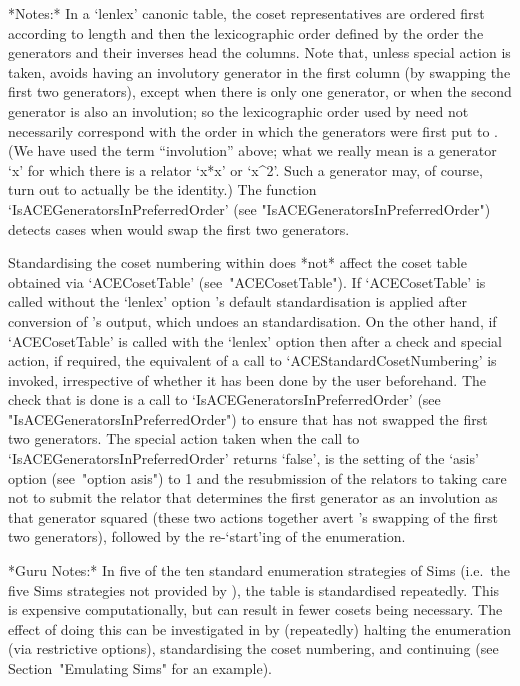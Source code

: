 *Notes:*
In a `lenlex' canonic table, the  coset  representatives  are  ordered
first according to length and then the lexicographic order defined  by
the order the generators and their inverses  head  the  columns.  Note
that,  unless  special  action  is  taken,  {\ACE}  avoids  having  an
involutory generator in the first column (by swapping  the  first  two
generators), except when there is only  one  generator,  or  when  the
second generator is also an involution;  so  the  lexicographic  order
used by {\ACE} need not necessarily correspond with the order in which
the generators were first put  to  {\ACE}.  (We  have  used  the  term
``involution'' above; what we really mean is  a  generator  `x'  for
which there is a relator `x*x' or `x^2'.  Such  a  generator  may,  of
course,  turn  out  to  actually  be  the  identity.)   The   function
`IsACEGeneratorsInPreferredOrder'                                 (see
"IsACEGeneratorsInPreferredOrder") detects  cases  when  {\ACE}  would
swap the first two generators.

Standardising the coset numbering within {\ACE} does *not* affect  the
{\GAP} coset table obtained via `ACECosetTable' (see~"ACECosetTable").
If `ACECosetTable' is called  without  the  `lenlex'  option  {\GAP}'s
default  standardisation  is  applied  after  conversion  of  {\ACE}'s
output, which undoes an {\ACE} standardisation. On the other hand,  if
`ACECosetTable' is called with the `lenlex' option then after a  check
and  special  action,  if  required,  the  equivalent  of  a  call  to
`ACEStandardCosetNumbering' is invoked, irrespective of whether it has
been done by the user beforehand. The check that is done is a call  to
`IsACEGeneratorsInPreferredOrder'                                 (see
"IsACEGeneratorsInPreferredOrder")  to  ensure  that  {\ACE}  has  not
swapped the first two generators. The special action  taken  when  the
call to  `IsACEGeneratorsInPreferredOrder'  returns  `false',  is  the
setting of  the  `asis'  option  (see~"option  asis")  to  1  and  the
resubmission of the relators to {\ACE} taking care not to  submit  the
relator that determines the first generator as an involution  as  that
generator squared (these two actions together avert {\ACE}'s  swapping
of the first two generators), followed by  the  re-`start'ing  of  the
enumeration.

*Guru Notes:*
In  five  of  the  ten  standard  enumeration   strategies   of   Sims
\cite{Sim94} (i.e.~the five Sims strategies not provided  by  {\ACE}),
the   table   is   standardised   repeatedly.   This   is    expensive
computationally, but can result in fewer cosets being  necessary.  The
effect of doing this can be investigated  in  {\ACE}  by  (repeatedly)
halting the enumeration (via restrictive options),  standardising  the
coset numbering, and continuing (see Section~"Emulating Sims"  for  an
example).

